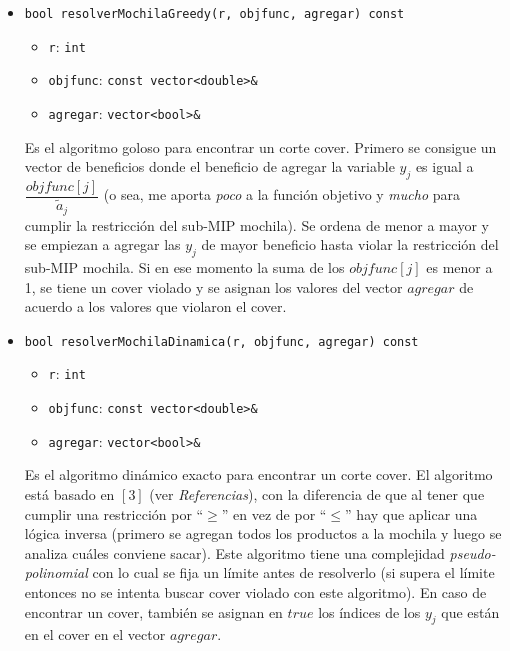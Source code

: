 \begin{itemize}
\item \verb_bool resolverMochilaGreedy(r, objfunc, agregar) const_
	\begin{itemize}
	\item \verb_r_: \verb_int_
	\item \verb_objfunc_: \verb_const vector<double>&_
	\item \verb_agregar_: \verb_vector<bool>&_
	\end{itemize}
Es el algoritmo goloso para encontrar un corte cover. Primero se consigue un vector de beneficios donde el beneficio de agregar la variable $y_j$ es igual a $\dfrac{objfunc[j]}{\tilde{a}_j}$ (o sea, me aporta \emph{poco} a la función objetivo y \emph{mucho} para cumplir la restricción del sub-MIP mochila). Se ordena de menor a mayor y se empiezan a agregar las $y_j$ de mayor beneficio hasta violar la restricción del sub-MIP mochila. Si en ese momento la suma de los $objfunc[j]$ es menor a 1, se tiene un cover violado y se asignan los valores del vector $agregar$ de acuerdo a los valores que violaron el cover.

\item \verb_bool resolverMochilaDinamica(r, objfunc, agregar) const_
	\begin{itemize}
	\item \verb_r_: \verb_int_
	\item \verb_objfunc_: \verb_const vector<double>&_
	\item \verb_agregar_: \verb_vector<bool>&_
	\end{itemize}
Es el algoritmo dinámico exacto para encontrar un corte cover. El algoritmo está basado en $[3]$ (ver \emph{Referencias}), con la diferencia de que al tener que cumplir una restricción por ``$\geq$'' en vez de por ``$\leq$'' hay que aplicar una lógica inversa (primero se agregan todos los productos a la mochila y luego se analiza cuáles conviene sacar). Este algoritmo tiene una complejidad \emph{pseudo-polinomial} con lo cual se fija un límite antes de resolverlo (si supera el límite entonces no se intenta buscar cover violado con este algoritmo). En caso de encontrar un cover, también se asignan en $true$ los índices de los $y_j$ que están en el cover en el vector $agregar$.
\end{itemize}
